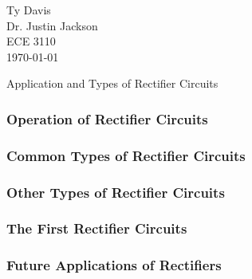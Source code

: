 \documentclass[12pt]{article}
\begin{document}
\begin{flushleft}

Ty Davis\\
Dr. Justin Jackson\\
ECE 3110\\
\today \\


\begin{center}
  Application and Types of Rectifier Circuits
\end{center}



\setlength{\parindent}{0.5in}



\subsubsection*{Operation of Rectifier Circuits}


\subsubsection*{Common Types of Rectifier Circuits}


\subsubsection*{Other Types of Rectifier Circuits}


\subsubsection*{The First Rectifier Circuits}


\subsubsection*{Future Applications of Rectifiers}




\newpage
\nocite{*}

\printbibliography

\end{flushleft}
\end{document}
